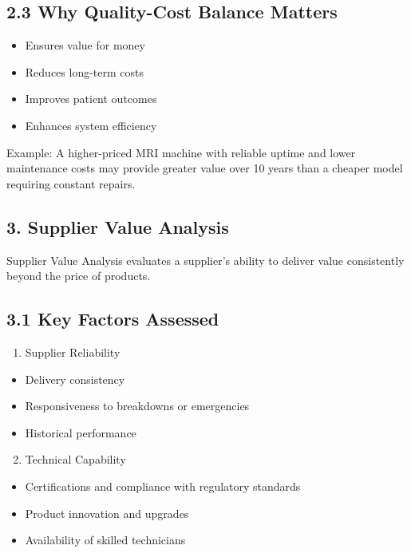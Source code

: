\documentclass[10pt]{article}
\begin{document}
\subsection*{2.3 Why Quality-Cost Balance Matters}
\begin{itemize}
  \item Ensures value for money
  \item Reduces long-term costs
  \item Improves patient outcomes
  \item Enhances system efficiency
\end{itemize}

Example: A higher-priced MRI machine with reliable uptime and lower maintenance costs may provide greater value over 10 years than a cheaper model requiring constant repairs.

\subsection*{3. Supplier Value Analysis}
Supplier Value Analysis evaluates a supplier's ability to deliver value consistently beyond the price of products.

\subsection*{3.1 Key Factors Assessed}
\begin{enumerate}
  \item Supplier Reliability
\end{enumerate}

\begin{itemize}
  \item Delivery consistency
  \item Responsiveness to breakdowns or emergencies
  \item Historical performance
\end{itemize}

\begin{enumerate}
  \setcounter{enumi}{1}
  \item Technical Capability
\end{enumerate}

\begin{itemize}
  \item Certifications and compliance with regulatory standards
  \item Product innovation and upgrades
  \item Availability of skilled technicians
\end{itemize}
\end{document}
